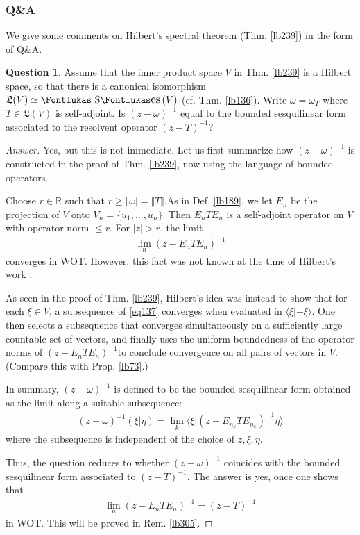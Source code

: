 \documentclass[12pt,b5paper,notitlepage]{article}
\theoremstyle{definition}
\newtheorem{question}[df]{Question}
\theoremstyle{plain}
\DeclareMathOperator{\Ses}{\text{\Fontlukas S}\text{\kern -0pt {\Fontlukas\large es}}\,}
\newcommand{\fk}{\mathfrak}
\newcommand{\bk}[1]{\langle {#1}\rangle}
\newcommand{\Rbb}{\mathbb R}
\numberwithin{equation}{section}
\begin{document}
\subsubsection{Q\&A}


We give some comments on Hilbert's spectral theorem (Thm. \ref{lb239}) in the form of Q\&A.


\begin{question}\label{lb242}
Assume that the inner product space $V$ in Thm. \ref{lb239} is a Hilbert space, so that there is a canonical isomorphism $\fk L(V)\simeq\Ses(V)$ (cf. Thm. \ref{lb136}). Write $\omega=\omega_T$ where $T\in\fk L(V)$ is self-adjoint. Is $(z-\omega)^{-1}$ equal to the bounded sesquilinear form associated to the resolvent operator $(z-T)^{-1}$?
\end{question}

\begin{proof}[Answer]
Yes, but this is not immediate. Let us first summarize how $(z-\omega)^{-1}$ is constructed in the proof of Thm. \ref{lb239}, now using the language of bounded operators.

Choose $r\in\Rbb$ such that $r\geq\Vert\omega\vert=\Vert T\Vert$.As in Def. \ref{lb189}, we let $E_n$ be the projection of $V$ onto $V_n=\{u_1,\dots,u_n\}$. Then $E_nTE_n$ is a self-adjoint operator on $V$ with operator norm $\leq r$. For $|z|>r$, the limit
\begin{align}\label{eq137}
\lim_n (z-E_nTE_n)^{-1}
\end{align}
converges in WOT. However, this fact was not known at the time of Hilbert's work \cite{Hil06}. 

As seen in the proof of Thm. \ref{lb239}, Hilbert's idea was instead to show that for each $\xi\in V$, a subsequence of \eqref{eq137} converges when evaluated in $\bk{\xi|-\xi}$. One then selects a subsequence that converges simultaneously on a sufficiently large countable set of vectors, and finally uses the uniform boundedness of the operator norms of $(z-E_nTE_n)^{-1}$to conclude convergence on all pairs of vectors in $V$. (Compare this with Prop. \ref{lb73}.)

In summary, $(z-\omega)^{-1}$ is defined to be the bounded sesquilinear form obtained as the limit along a suitable subsequence:
\begin{align}
(z-\omega)^{-1}(\xi|\eta)=\lim_k \bk{\xi|(z-E_{n_k}TE_{n_k})^{-1}\eta}
\end{align}
where the subsequence is independent of the choice of $z,\xi,\eta$.

Thus, the question reduces to whether $(z-\omega)^{-1}$ coincides with the bounded sesquilinear form associated to $(z-T)^{-1}$. The answer is yes, once one shows that
\begin{align}
\lim_n (z-E_nTE_n)^{-1}=(z-T)^{-1}
\end{align}
in WOT. This will be proved in Rem. \ref{lb305}.
\end{proof}
\end{document}
